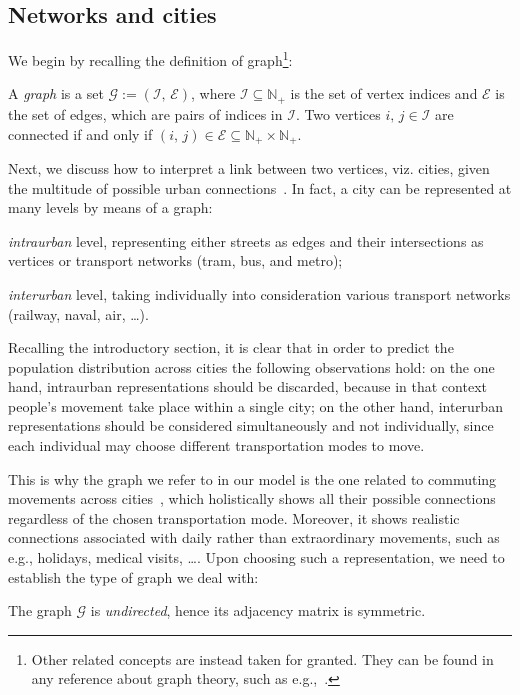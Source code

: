 \documentclass[a4paper]{article}
\newcommand{\N}{\mathbb{N}}
\begin{document}
\subsection{Networks and cities}
\label{secNetworksAndCities}
%
We begin by recalling the definition of graph\footnote{Other related concepts are instead taken for granted. They can be found in any reference about graph theory, such as e.g.,~\cite{Barthelemy2011}.}:
            
\begin{dfn}[Graph] \label{defGraph}
A \emph{graph} is a set $\mathcal G:=(\mathcal I,\,\mathcal E)$, where $\mathcal I\subseteq\N_+$ is the set of vertex indices and $\mathcal E$ is the set of edges, which are pairs of indices in $\mathcal I$. Two vertices $i,\,j\in\mathcal I$ are connected if and only if $(i,\,j)\in\mathcal E\subseteq\N_+\times\N_+$.
\end{dfn}
            
Next, we discuss how to interpret a link between two vertices, viz. cities, given the multitude of possible urban connections~\cite{Barthelemy2011}. In fact, a city can be represented at many levels by means of a graph:
\begin{enumerate*}[label=(\roman*)]
\item \textit{intraurban} level, representing either streets as edges and their intersections as vertices or transport networks (tram, bus, and metro);
\item \textit{interurban} level, taking individually into consideration various transport networks (railway, naval, air, \dots).
\end{enumerate*}
Recalling the introductory section, it is clear that in order to predict the population distribution across cities the following observations hold: on the one hand, intraurban representations should be discarded, because in that context people's movement take place within a single city; on the other hand, interurban representations should be considered simultaneously and not individually, since each individual may choose different transportation modes to move.
    
This is why the graph we refer to in our model is the one related to commuting movements across cities~\cite{Barthelemy2011,DeMontis2007}, which holistically shows all their possible connections regardless of the chosen transportation mode. Moreover, it shows realistic connections associated with daily rather than extraordinary movements, such as e.g., holidays, medical visits, \dots. Upon choosing such a representation, we need to establish the type of graph we deal with:
\begin{hyp} \label{hypGraphType}
The graph $\mathcal G$ is \emph{undirected}, hence its adjacency matrix is symmetric.
\end{hyp}
\end{document}
